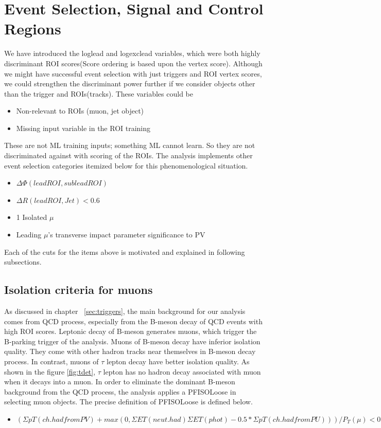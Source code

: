 \clearpage
\chapter{Event Selection, Signal and Control Regions}\label{sec:selections}
We have introduced the loglead and logexclead variables, which were both highly discriminant ROI scores(Score ordering is based upon the vertex score).
Although we might have successful event selection with just triggers and ROI vertex scores, we could strengthen the discriminant power further if we consider objects other than the trigger and ROIs(tracks).
These variables could be
\begin{itemize}
 \item Non-relevant to ROIs (muon, jet object)
 \item Missing input variable in the ROI training
\end{itemize}
These are not ML training inputs; something ML cannot learn.
So they are not discriminated against with scoring of the ROIs.
The analysis implements other event selection categories itemized below for this phenomenological situation.
\begin{itemize}
  \item $\Delta\Phi(lead ROI,sublead ROI)$ 
  \item $\Delta R(lead ROI, Jet)<$0.6 
  \item 1 Isolated $\mu$
  \item Leading $\mu$'s transverse impact parameter significance to PV
\end{itemize}

Each of the cuts for the items above is motivated and explained in following subsections.

\section{Isolation criteria for muons}\label{ref:muISO}
As discussed in chapter ~\ref{sec:triggers}, the main background for our analysis comes from QCD process, especially from the B-meson decay of QCD events with high ROI scores.
Leptonic decay of B-meson generates muons, which trigger the B-parking trigger of the analysis.
Muons of B-meson decay have inferior isolation quality.
They come with other hadron tracks near themselves in B-meson decay process.
In contrast, muons of $\tau$ lepton decay have better isolation quality.
As shown in the figure \ref{fig:tdet}, $\tau$ lepton has no hadron decay associated with muon when it decays into a muon.
In order to eliminate the dominant B-meson background from the QCD process, the analysis applies a PFISOLoose in selecting muon objects.
The precise definition of PFISOLoose is defined below.
\begin{itemize}
  \item $(\Sigma pT(ch.had from PV)+max(0,\Sigma ET(neut.had) \Sigma ET (phot)-0.5* \Sigma pT(ch.had from PU)))/P_{T}(\mu)<0.25$
\end{itemize}

